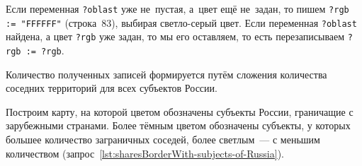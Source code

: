 Если переменная \lstinline|?oblast| уже не~пустая, а~цвет ещё не~задан, 
то пишем \lstinline|?rgb := "FFFFFF"| (строка~83), выбирая светло-серый цвет. 
Если переменная \lstinline|?oblast| найдена, а цвет \lstinline|?rgb| уже задан, 
то мы его оставляем, то есть перезаписываем \lstinline|?rgb := ?rgb|.

Количество полученных записей формируется путём сложения количества соседних территорий для всех субъектов России. 



\newpage
Построим карту, на которой цветом обозначены субъекты России, 
граничащие с зарубежными странами. 
Более тёмным цветом обозначены субъекты, у которых большее количество заграничных соседей, 
более светлым~--- с меньшим количеством (запрос~\ref{lst:sharesBorderWith-subjects-of-Russia}).

